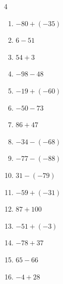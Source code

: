 \begin{multicols}{4}
\begin{enumerate}
        \phantom{$=-67$}

  \item $-80+(-35)$

        \phantom{$=-115$}

  \item $6-51$

        \phantom{$=-45$}

  \item $54+3$

        \phantom{$=57$}

  \item $-98-48$

        \phantom{$=-146$}

  \item $-19+(-60)$

        \phantom{$=-79$}

  \item $-50-73$

        \phantom{$=-123$}

  \item $86+47$

        \phantom{$=133$}

  \item $-34-(-68)$

        \phantom{$=34$}

\columnbreak %

  \item $-77-(-88)$

        \phantom{$=11$}

  \item $31-(-79)$

        \phantom{$=110$}

  \item $-59+(-31)$

        \phantom{$=-90$}

  \item $87+100$

        \phantom{$=187$}

  \item $-51+(-3)$

        \phantom{$=-54$}

  \item $-78+37$

        \phantom{$=-41$}

  \item $65-66$

        \phantom{$=-1$}

  \item $-4+28$


\end{enumerate}
\end{multicols}
